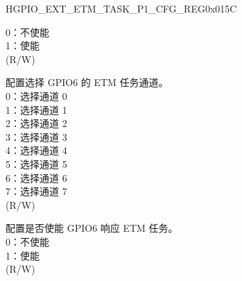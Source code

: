 \begin{register}{H}{GPIO\_EXT\_ETM\_TASK\_P1\_CFG\_REG}{0x015C}
\begin{regdesc}
\begin{reglist}
0：不使能\\
1：使能\\ (R/W)
\label{fielddesc:GPIOEXTETMTASKGPIO6SEL}\item [GPIO\_EXT\_ETM\_TASK\_GPIO6\_SEL] 配置选择 GPIO6 的 ETM 任务通道。\\
0：选择通道 0\\
1：选择通道 1\\
2：选择通道 2\\
3：选择通道 3\\
4：选择通道 4\\
5：选择通道 5\\
6：选择通道 6\\
7：选择通道 7\\ (R/W) 
\label{fielddesc:GPIOEXTETMTASKGPIO6EN}\item [GPIO\_EXT\_ETM\_TASK\_GPIO6\_EN] 配置是否使能 GPIO6 响应 ETM 任务。\\
0：不使能\\
1：使能\\ (R/W)
\item [见下页]
\end{reglist}\end{regdesc}
\end{register}

